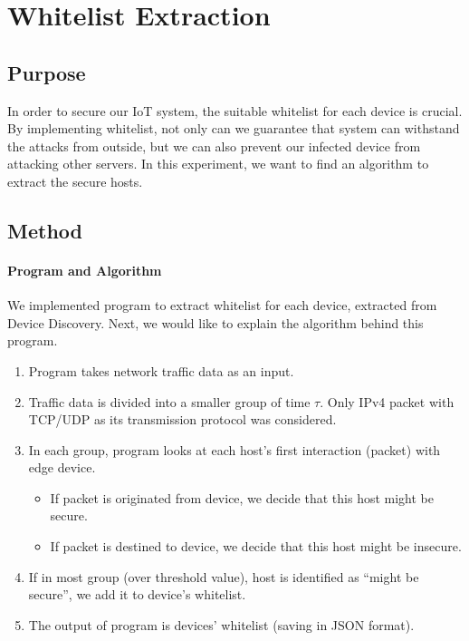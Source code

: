 
\section{Whitelist Extraction}
\label{s4:whitelist}
\subsection{Purpose}
In order to secure our IoT system, the suitable whitelist for each device is crucial. By implementing whitelist, not only can we guarantee that system can withstand the attacks from outside, but we can also prevent our infected device from attacking other servers. In this experiment, we want to find an algorithm to extract the secure hosts. 

\subsection{Method}
\paragraph{Program and Algorithm}
We implemented program to extract whitelist for each device, extracted from Device Discovery. Next, we would like to explain the algorithm behind this program.

\begin{enumerate} 
    \item Program takes network traffic data as an input.
    \item Traffic data is divided into a smaller group of time $\tau$. Only IPv4 packet with TCP/UDP as its transmission protocol was considered. 
    \item In each group, program looks at each host’s first interaction (packet) with edge device.
    \begin{itemize}
        \item If packet is originated from device, we decide that this host might be secure. 
        \item If packet is destined to device, we decide that this host might be insecure.
    \end{itemize}
    \item If in most group (over threshold value), host is identified as “might be secure”, we add it to device’s whitelist. 
    \item The output of program is devices’ whitelist (saving in JSON format).
\end{enumerate}

